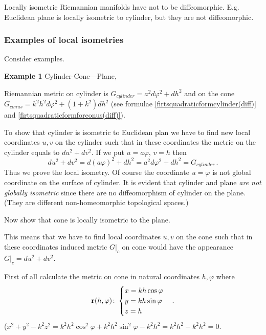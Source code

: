 \documentclass[12pt]{article}
\theoremstyle{theorem}
\numberwithin{equation}{section}
\begin{document}
      \m

      Locally isometric Riemannian manifolds have not to be diffeomorphic. E.g. Euclidean plane
      is locally isometric to cylinder, but they are not diffeomorphic.


      \subsubsection {Examples of local isometries}

   Consider examples.

\m

      {\bf Example 1} Cylinder-Cone---Plane,

     Riemannian metric on cylinder is $G_{cylinder}=a^2d\varphi^2+dh^2$ and on the cone
       $G_{conus}=k^2h^2d\varphi^2+(1+k^2)dh^2$ (see formulae \eqref{firtsquadraticformcylinder(diff)}
       and \eqref{firtsquadraticformforconus(diff)}).

       To show that cylinder is isometric to Euclidean plan we have to find
       new local coordinates  $u,v$ on the cylinder such that in these coordinates the metric on the cylinder
       equals to $du^2+dv^2$. If we put $u=a\varphi$, $v=h$ then
                 \begin{equation}\label{localisometryofcylindertoplane}
            du^2+dv^2=d(a\varphi)^2+dh^2=a^2d\varphi^2+dh^2=G_{cylinder}\,.
                 \end{equation}
      Thus  we prove the local isometry. Of course the coordinate $u=\varphi$ is not global coordinate on the surface
      of cylinder. It is evident that cylinder and plane {\it are not globally isometric} since there
      are no diffeomorphism of cylinder on the plane. (They are different non-homeomorphic topological spaces.)


  \m

   Now show that cone is locally isometric to the plane.


     This means that we have to find local coordinates $u,v$ on the cone such that in these coordinates
  induced metric $G\vert_c$ on cone would have the appearance $G\vert_c=du^2+dv^2$.

  First of all calculate the metric on cone in natural coordinates $h,\varphi$ where
             $$
          {\bf r}(h,\varphi)\colon
          \begin{cases}
          x=kh\cos\varphi\cr
          y=kh\sin\varphi\cr
          z=h\cr
          \end{cases}.
             $$
($x^2+y^2-k^2z^2=k^2h^2\cos^2\varphi+k^2h^2\sin^2\varphi-k^2h^2=k^2h^2-k^2h^2=0$.
\end{document}
